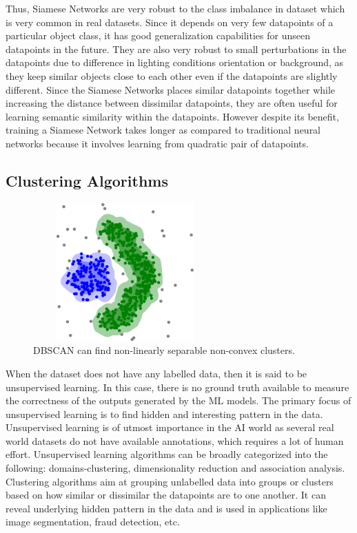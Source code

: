 \vspace{5mm}

Thus, Siamese Networks are very robust to the class imbalance in dataset which is very common in real datasets. Since it depends on very few datapoints of a particular object class, it has good generalization capabilities for unseen datapoints in the future. They are also very robust to small perturbations in the datapoints due to difference in lighting conditions orientation or background, as they keep similar objects close to each other even if the datapoints are slightly different. Since the Siamese Networks places similar datapoints together while increasing the distance between dissimilar datapoints, they are often useful for learning semantic similarity within the datapoints. However despite its benefit, training a Siamese Network takes longer as compared to traditional neural networks because it involves learning from quadratic pair of datapoints.\cite{siamese_network, koch2015siamese}

\subsection{Clustering Algorithms}
\label{sec:Clustering_Algorithms}
\begin{figure}[t]
  \centering
  \includegraphics[width=200pt,height=150pt]{pictures/DBSCAN-density-data.png}
  \caption{\ac{DBSCAN} can find non-linearly separable non-convex clusters.\cite{dbscanWiki}}
  \label{fig:dbscan}
\end{figure} 
When the dataset does not have any labelled data, then it is said to be unsupervised learning. In this case, there is no ground truth available to measure the correctness of the outputs generated by the \ac{ML} models. The primary focus of unsupervised learning is to find hidden and interesting pattern in the data. Unsupervised learning is of utmost importance in the \ac{AI} world as several real world datasets do not have available annotations, which requires a lot of human effort. Unsupervised learning algorithms can be broadly categorized into the following: domains-clustering, dimensionality reduction and association analysis. Clustering algorithms aim at grouping unlabelled data into groups or clusters based on how similar or dissimilar the datapoints are to one another. It can reveal underlying hidden pattern in the data and is used in applications like image segmentation, fraud detection, etc. 

